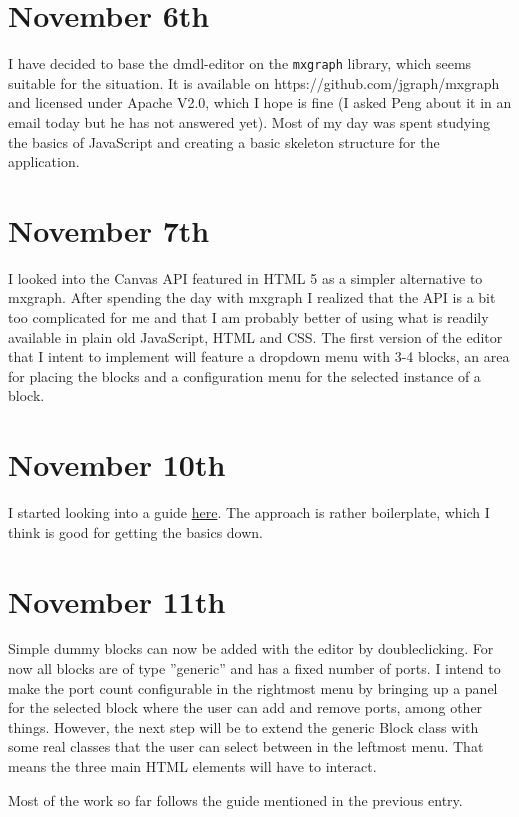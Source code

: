 \documentclass{article}
\begin{document}
\section{November 6th}
I have decided to base the dmdl-editor on the \texttt{mxgraph} library, which seems suitable for the situation.
It is available on https://github.com/jgraph/mxgraph and licensed under Apache V2.0, which I hope is fine (I asked
Peng about it in an email today but he has not answered yet). Most of my day was spent studying the basics of 
JavaScript and creating a basic skeleton structure for the application.

\section{November 7th}
I looked into the Canvas API featured in HTML 5 as a simpler alternative to mxgraph. After spending the day with mxgraph
I realized that the API is a bit too complicated for me and that I am probably better of using what is readily available in
plain old JavaScript, HTML and CSS. The first version of the editor that I intent to implement will feature a dropdown menu
with 3-4 blocks, an area for placing the blocks and a configuration menu for the selected instance of a block.

\section{November 10th}
I started looking into a guide \href{https://simonsarris.com/making-html5-canvas-useful/}{here}.
The approach is rather boilerplate, which I think is good for getting the basics down.

\section{November 11th}
Simple dummy blocks can now be added with the editor by doubleclicking. For now
all blocks are of type ''generic'' and has a fixed number of ports. I intend to make the port
count configurable in the rightmost menu by bringing up a panel for the selected block where
the user can add and remove ports, among other things. However, the next step will be
to extend the generic Block class with some real classes that the user can select
between in the leftmost menu. That means the three main HTML elements will have to interact.

Most of the work so far follows the guide mentioned in the previous entry.
\end{document}
